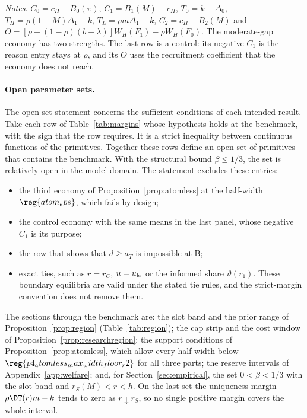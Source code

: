 \begin{table}[ht]
\begin{tabular}{@{}lrrrrrrrc@{}}
\bottomrule
\end{tabular}
\par\medskip
\begin{minipage}{0.95\linewidth}\footnotesize
\textit{Notes.} \(C_0=c_H-B_0(\pi)\), \(C_1=B_1(M)-c_H\), \(T_0=k-\Delta_0\), \(T_H=\rho(1-M)\Delta_1-k\),
\(T_L=\rho m\Delta_1-k\), \(C_2=c_H-B_2(M)\) and \(O=[\rho+(1-\rho)(b+\lambda)]W_H(F_1)-\rho W_H(F_0)\). The moderate-gap
economy has two strengths. The last row is a control: its negative \(C_1\) is the reason entry stays at \(\rho\), and
its \(O\) uses the recruitment coefficient that the economy does not reach.
\end{minipage}
\end{table}

\paragraph{Open parameter sets.}
The open-set statement concerns the sufficient conditions of each intended result. Take each row of
Table~\ref{tab:margins} whose hypothesis holds at the benchmark, with the sign that the row requires. It is a strict
inequality between continuous functions of the primitives. Together these rows define an open set of primitives that
contains the benchmark. With the structural bound \(\beta\le1/3\), the set is relatively open in the model domain.
The statement excludes these entries:
\begin{itemize}[leftmargin=2em,itemsep=0pt]
\item the third economy of Proposition~\ref{prop:atomless} at the half-width \(\reg{atom_eps}\), which fails by design;
\item the control economy with the same means in the last panel, whose negative \(C_1\) is its purpose;
\item the row that shows that \(d\ge a_T\) is impossible at B;
\item exact ties, such as \(r=r_C\), \(u=u_{\rm lo}\) or the informed share \(\bar\vartheta(r_1)\). These boundary
equilibria are valid under the stated tie rules, and the strict-margin convention does not remove them.
\end{itemize}
The sections through the benchmark are: the slot band and the prior range of
Proposition~\ref{prop:region} (Table~\ref{tab:region}); the cap strip and the cost window of
Proposition~\ref{prop:researchregion}; the support conditions of Proposition~\ref{prop:atomless}, which allow every
half-width below \(\reg{p4_atomless_max_width_floor_r2}\) for all three parts; the reserve intervals of
Appendix~\ref{app:welfare}; and, for Section~\ref{sec:empirical}, the set \(0<\beta<1/3\) with the slot band and
\(r_S(M)<r<h\). On the last set the uniqueness margin \(\rho\DT(r)m-k\) tends to zero as \(r\downarrow r_S\), so no
single positive margin covers the whole interval.
